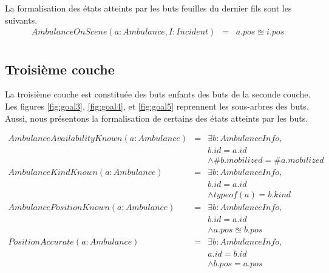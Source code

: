 	La formalisation des états atteints par les buts feuilles du dernier fils sont
	les suivants.		
	\singlespacing
	\begin{equation*}
		\begin{array}{rcl}
			AmbulanceOnScene(a:Ambulance, I:Incident)
			& = & a.pos \approxeq i.pos \\ 
		\end{array}
	\end{equation*}
	\onehalfspacing


\subsection{Troisième couche}

	La troisième couche est constituée des buts enfants
	des buts de la seconde couche. Les figures \ref{fig:goal3}, \ref{fig:goal4},
	et \ref{fig:goal5} reprennent les sous-arbres des buts. Aussi, nous
	présentons la formalisation de certains des états atteints par les
	buts.

	\singlespacing
	\begin{equation*}
		\begin{array}{rcl}
		AmbulanceAvailabilityKnown(a: Ambulance)
		& = & \exists b: AmbulanceInfo, \\
		&   & b.id = a.id \\
		&   & \wedge \#b.mobilized = \#a.mobilized \\

		AmbulanceKindKnown(a: Ambulance)
		& = & \exists b: AmbulanceInfo, \\
		&   & b.id = a.id \\
		&   & \wedge typeof(a) = b.kind \\

		AmbulancePositionKnown(a:Ambulance)
		& = & \exists b:AmbulanceInfo, \\
		&   & b.id = a.id \\
		&   & \wedge a.pos \approxeq b.pos \\
		
		PositionAccurate(a:Ambulance)
		& = & \exists b:AmbulanceInfo, \\
		&   & a.id = b.id \\
		&   & \wedge b.pos = a.pos \\
		\end{array}
	\end{equation*}
	\onehalfspacing


